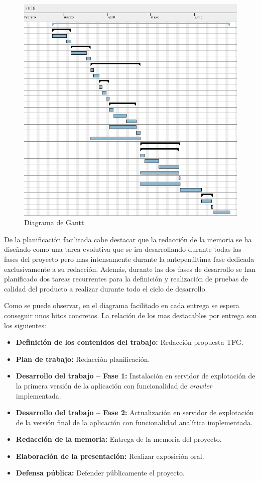 \documentclass[11pt,a4paper]{article}
\begin{document}
\begin{figure}[H]
\centering
\includegraphics[scale=0.3]{planificacion/diagrama-gantt.png}
\caption{Diagrama de Gantt}
\end{figure}

De la planificación facilitada cabe destacar que la redacción de la memoria se ha diseñado como una tarea evolutiva que se ira desarrollando durante todas las fases del proyecto pero mas intensamente durante la antepenúltima fase dedicada exclusivamente a su redacción. Además, durante las dos fases de desarrollo se han planificado dos tareas recurrentes para la definición y realización de pruebas de calidad del producto a realizar durante todo el ciclo de desarrollo.

Como se puede observar, en el diagrama facilitado en cada entrega se espera conseguir unos hitos concretos. La relación de los mas destacables por entrega son los siguientes:

\begin{itemize}
\item \textbf{Definición de los contenidos del trabajo:} Redacción propuesta TFG.
\item \textbf{Plan de trabajo:} Redacción planificación.
\item \textbf{Desarrollo del trabajo – Fase 1:} Instalación en servidor de explotación de la primera versión de la aplicación con funcionalidad de \textit{crawler} implementada.
\item \textbf{Desarrollo del trabajo – Fase 2:} Actualización en servidor de explotación de la versión final de la aplicación con funcionalidad analítica implementada.
\item \textbf{Redacción de la memoria:} Entrega de la memoria del proyecto.
\item \textbf{Elaboración de la presentación:} Realizar exposición oral.
\item \textbf{Defensa pública:} Defender públicamente el proyecto.
\end{itemize}
\end{document}
